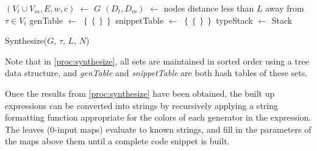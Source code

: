 \begin{procedure}
$(V_t\cup V_m, E, w, c)$ $\leftarrow$ $G$ \;
$(D_t, D_m)$ $\leftarrow$ nodes distance less than $L$ away from $\tau\in V_t$\;
genTable $\leftarrow$ $\left\{\left\{\right\}\right\}$ \;
snippetTable $\leftarrow$ $\left\{\left\{\right\}\right\}$ \;
typeStack $\leftarrow$ \KwNew Stack\;
\;
\caption{Synthesize($G$, $\tau$, $L$, $N$)}\label{proc:synthesize}
\end{procedure}

Note that in \ref{proc:synthesize}, all sets are maintained in sorted order using a tree data structure, and \textit{genTable} and \textit{snippetTable} are both hash tables of these sets.

Once the results from \ref{proc:synthesize} have been obtained, the built up expressions can be converted into strings by recursively applying a string formatting function appropriate for the colors of each generator in the expression. The leaves ($0$-input maps) evaluate to known strings, and fill in the parameters of the maps above them until a complete code snippet is built.

